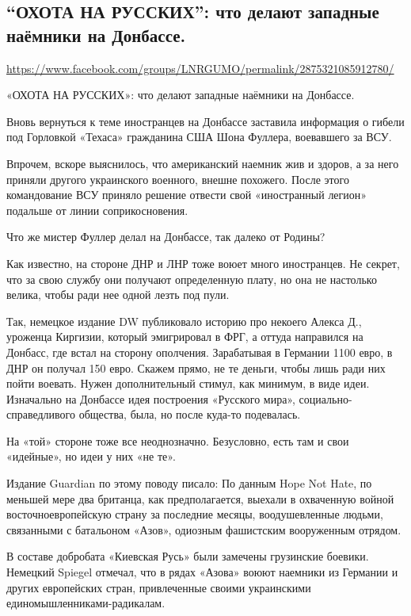  
 
\subsection{``ОХОТА НА РУССКИХ'': что делают западные наёмники на Донбассе.}
\url{https://www.facebook.com/groups/LNRGUMO/permalink/2875321085912780/}

«ОХОТА НА РУССКИХ»: что делают западные наёмники на Донбассе.

Вновь вернуться к теме иностранцев на Донбассе заставила информация о гибели
под Горловкой «Техаса» гражданина США Шона Фуллера, воевавшего за ВСУ.

Впрочем, вскоре выяснилось, что американский наемник жив и здоров, а за него
приняли другого украинского военного, внешне похожего.  После этого
командование ВСУ приняло решение отвести свой «иностранный легион» подальше от
линии соприкосновения.

Что же мистер Фуллер делал на Донбассе, так далеко от Родины?

Как известно, на стороне ДНР и ЛНР тоже воюет много иностранцев.  Не секрет,
что за свою службу они получают определенную плату, но она не настолько велика,
чтобы ради нее одной лезть под пули.

Так, немецкое издание DW публиковало историю про некоего Алекса Д., уроженца
Киргизии, который эмигрировал в ФРГ, а оттуда направился на Донбасс, где встал
на сторону ополчения. Зарабатывая в Германии 1100 евро, в ДНР он получал 150
евро. Скажем прямо, не те деньги, чтобы лишь ради них пойти воевать.  Нужен
дополнительный стимул, как минимум, в виде идеи.  Изначально на Донбассе идея
построения «Русского мира», социально-справедливого общества, была, но после
куда-то подевалась.

На «той» стороне тоже все неоднозначно.  Безусловно, есть там и свои «идейные»,
но идеи у них «не те».

Издание Guardian по этому поводу писало: По данным Hope Not Hate, по меньшей
мере два британца, как предполагается, выехали в охваченную войной
восточноевропейскую страну за последние месяцы, воодушевленные людьми,
связанными с батальоном «Азов», одиозным фашистским вооруженным отрядом.

В составе добробата «Киевская Русь» были замечены грузинские боевики.  Немецкий
Spiegel отмечал, что в рядах «Азова» воюют наемники из Германии и других
европейских стран, привлеченные своими украинскими единомышленниками-радикалам.

